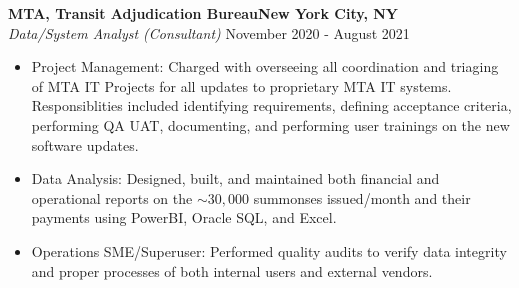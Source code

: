 \documentclass[a4paper]{article}
\begin{document}
\textbf{MTA, Transit Adjudication Bureau\hfill New York City, NY}\\
\textit{Data/System Analyst (Consultant)} \hfill November 2020 - August 2021\\
\vspace{-1mm}
\begin{itemize} \itemsep 1pt
    \item Project Management: Charged with overseeing all coordination and triaging of MTA IT Projects for all updates to proprietary MTA IT systems.
            Responsiblities included identifying requirements, defining acceptance criteria, performing QA UAT, documenting, and performing user trainings on the new software updates.
	\item Data Analysis: Designed, built, and maintained both financial and operational reports on the $\sim 30,000$ summonses issued/month and their payments using PowerBI, Oracle SQL, and Excel.
    \item Operations SME/Superuser: Performed quality audits to verify data integrity and proper processes of both internal users and external vendors.
\end{itemize}
\end{document}
